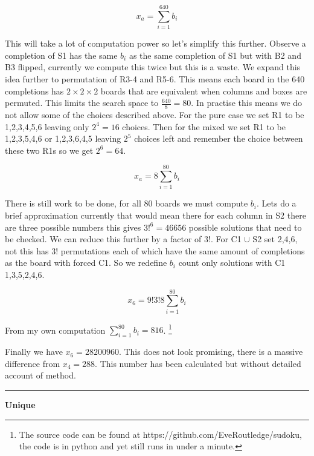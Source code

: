 \documentclass[a4paper,11pt]{report}
\newcounter{col}
\begin{document}
{\begin{equation}x_a = \sum^{640}_{i=1}b_i\end{equation}

This will take a lot of computation power so let's simplify this further. Observe a completion of S1 has the same $b_i$ as the same completion of S1 but with B2 and B3 flipped, currently we compute this twice but this is a waste. We expand this idea further to permutation of R3-4 and R5-6. This means each board in the 640 completions has $2\times 2\times 2$ boards that are equivalent when columns and boxes are permuted. This limits the search space to $\frac{640}{8}=80$. In practise this means we do not allow some of the choices described above. For the pure case we set R1 to be 1,2,3,4,5,6 leaving only $2^4=16$ choices. Then for the mixed we set R1 to be 1,2,3,5,4,6 or 1,2,3,6,4,5 leaving $2^5$ choices left and remember the choice between these two R1s so we get $2^6=64$. 

\begin{equation}x_a=8\sum^{80}_{i=1}b_i\end{equation}

There is still work to be done, for all 80 boards we must compute $b_i$. Lets do a brief approximation currently that would mean there for each column in S2 there are three possible numbers this gives $3!^6 = 46656$ possible solutions that need to be checked. We can reduce this further by a factor of 3!. For C1 $\cup$ S2 set 2,4,6, not this has 3! permutations each of which have the same amount of completions as the board with forced C1. So we redefine $b_i$ count only solutions with C1 1,3,5,2,4,6.

\begin{equation}x_6=9!3!8\sum^{80}_{i=1} b_i\end{equation}

From my own computation $\sum^{80}_{i=1} b_i=816$. \footnote{The source code can be found at https://github.com/EveRoutledge/sudoku, the code is in python and yet still runs in under a minute.}

Finally we have $x_6=28200960$. This does not look promising, there is a massive difference from $x_4=288$. This number has been calculated but without detailed account of method. 

\noindent\rule{4cm}{0.4pt}

\textbf{Unique}

}
\end{document}
